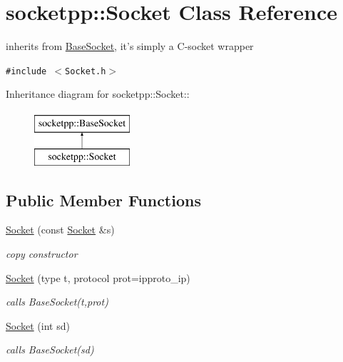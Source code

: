 \hypertarget{classsocketpp_1_1Socket}{
\section{socketpp::Socket Class Reference}
\label{classsocketpp_1_1Socket}
}
inherits from \hyperlink{classsocketpp_1_1BaseSocket}{BaseSocket}, it's simply a C-socket wrapper  


{\tt \#include $<$Socket.h$>$}

Inheritance diagram for socketpp::Socket::\begin{figure}[H]
\begin{center}
\leavevmode
\includegraphics[height=2cm]{classsocketpp_1_1Socket}
\end{center}
\end{figure}
\subsection*{Public Member Functions}
\begin{CompactItemize}
\item 
\hypertarget{classsocketpp_1_1Socket_799a836f2ceab366ab11ae234970d951}{
\hyperlink{classsocketpp_1_1Socket_799a836f2ceab366ab11ae234970d951}{Socket} (const \hyperlink{classsocketpp_1_1Socket}{Socket} \&s)}
\label{classsocketpp_1_1Socket_799a836f2ceab366ab11ae234970d951}

\begin{CompactList}\small\item\em copy constructor \item\end{CompactList}\item 
\hypertarget{classsocketpp_1_1Socket_c10e4f533ed78a3d898c1fe0cea09cef}{
\hyperlink{classsocketpp_1_1Socket_c10e4f533ed78a3d898c1fe0cea09cef}{Socket} (type t, protocol prot=ipproto\_\-ip)}
\label{classsocketpp_1_1Socket_c10e4f533ed78a3d898c1fe0cea09cef}

\begin{CompactList}\small\item\em calls BaseSocket(t,prot) \item\end{CompactList}\item 
\hypertarget{classsocketpp_1_1Socket_2ec875f75becab573f7720d50ab13c99}{
\hyperlink{classsocketpp_1_1Socket_2ec875f75becab573f7720d50ab13c99}{Socket} (int sd)}
\label{classsocketpp_1_1Socket_2ec875f75becab573f7720d50ab13c99}

\begin{CompactList}\small\item\em calls BaseSocket(sd) \item\end{CompactList}\end{CompactItemize}


